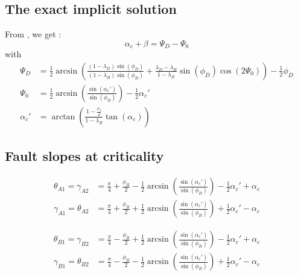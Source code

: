 \documentclass[a4paper]{scrartcl}
\begin{document}
\subsection{The exact implicit solution}

From \citep{Yuan2015}, we get :
\begin{equation}
	\alpha_c + \beta = \Psi_D - \Psi_0
	\label{eq:ECCW-implicit} 
\end{equation}
with
\begin{align}
	\Psi_D &= \frac{1}{2} \arcsin \left( \frac{(1 - \lambda_D) \sin(\phi_D)}{(1 - \lambda_B) \sin(\phi_B)} + \frac{\lambda_D - \lambda_B}{1 - \lambda_B} \sin(\phi_D) \cos(2 \Psi_0) \right) - \frac{1}{2} \phi_D
	\label{eq:ECCW-psi_D} \\ 
	\Psi_0 &= \frac{1}{2} \arcsin \left( \frac{\sin(\alpha_c')}{\sin(\phi_B)} \right)  - \frac{1}{2} \alpha_c'
	\label{eq:ECCW-psi_0} \\
	\alpha_c' & = \arctan \left( \frac{1 - \frac{\rho_f}{\rho}}{1 - \lambda_B} \tan(\alpha_c) \right)
	\label{eq:ECCW-alphacp} 
\end{align}


\subsection{Fault slopes at criticality}

\begin{align}
	\theta_{A1} = \gamma_{A2} &= \frac{\pi}{4} + \frac{\phi_B}{2} - \frac{1}{2} \arcsin \left( \frac{\sin(\alpha_c')}{\sin(\phi_B)} \right) - \frac{1}{2} \alpha_c' + \alpha_c
	\label{eq:theta-A} \\
	\gamma_{A1} = \theta_{A2} &= \frac{\pi}{4} + \frac{\phi_B}{2} + \frac{1}{2} \arcsin \left( \frac{\sin(\alpha_c')}{\sin(\phi_B)} \right) + \frac{1}{2} \alpha_c' - \alpha_c
	\label{eq:gamma-A}
\end{align}


\begin{align}
	\theta_{B1} = \gamma_{B2} &= \frac{\pi}{4} - \frac{\phi_B}{2} + \frac{1}{2} \arcsin \left( \frac{\sin(\alpha_c')}{\sin(\phi_B)} \right) - \frac{1}{2} \alpha_c' + \alpha_c
	\label{eq:theta-B} \\
	\gamma_{	B1} = \theta_{B2} &= \frac{\pi}{4} - \frac{\phi_B}{2} - \frac{1}{2} \arcsin \left( \frac{\sin(\alpha_c')}{\sin(\phi_B)} \right) + \frac{1}{2} \alpha_c' - \alpha_c
	\label{eq:gamma-B}
\end{align}
\end{document}
